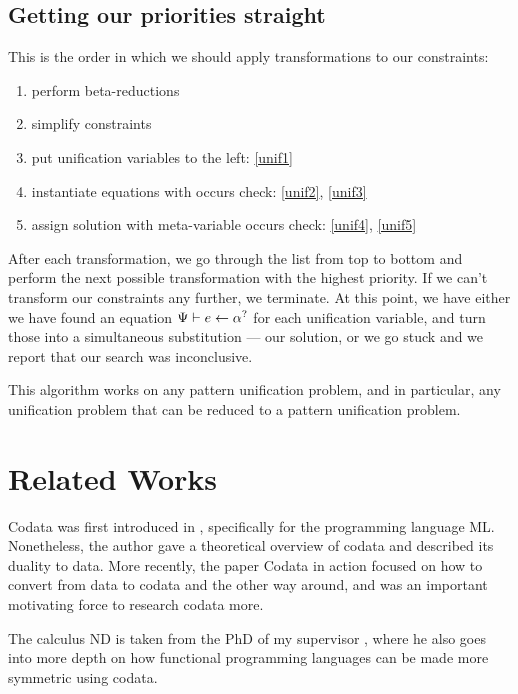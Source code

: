 \documentclass[twoside,12pt,a4paper]{article}
\begin{document}
\subsection{Getting our priorities straight}
This is the order in which we should apply transformations to our constraints:
\begin{enumerate}
    \item perform beta-reductions
    \item simplify constraints
    \item put unification variables to the left: \cref{unif1}
    \item instantiate equations with occurs check: \cref{unif2}, \cref{unif3}
    \item assign solution with meta-variable occurs check: \cref{unif4}, \cref{unif5}
\end{enumerate}
After each transformation, we go through the list from top to bottom and perform the next possible transformation with the highest priority.
If we can't transform our constraints any further, we terminate.
At this point, we have either we have found an equation $\Psi \vdash e \leftarrow \alpha^?$ for each unification variable,
and turn those into a simultaneous substitution --- our solution,
or we go stuck and we report that our search was inconclusive.

This algorithm works on any pattern unification problem, and in particular, any unification problem that can be reduced to a pattern unification problem. %

\section{Related Works}\label{sec:Related works}

Codata was first introduced in \cite{HAGINO1989629}, specifically for the programming language ML.
Nonetheless, the author gave a theoretical overview of codata and described its duality to data.
More recently, the paper Codata in action \cite{10.1007/978-3-030-17184-1_5} 
focused on how to convert from data to codata and the other way around, 
and was an important motivating force to research codata more.

The calculus ND is taken from the PhD of my supervisor \cite{binder2024programming}, 
where he also goes into more depth on how functional programming languages can be made more symmetric using codata.
\end{document}
